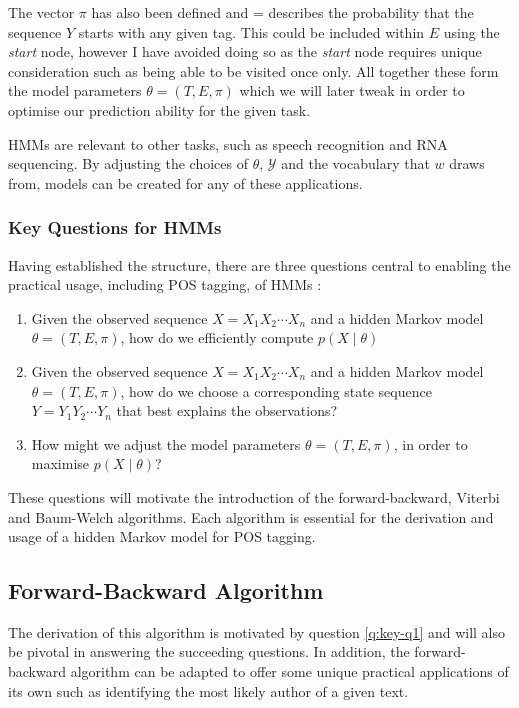 \documentclass[../main.tex]{subfiles}
\begin{document}
The vector $\pi$ has also been defined and = describes the probability that the sequence $Y$ starts with any given tag. This could be included within $E$ using the \textit{start} node, however I have avoided doing so as the \textit{start} node requires unique consideration such as being able to be visited once only.
All together these form the model parameters $\theta = (T,E,\pi)$ which we will later tweak in order to optimise our prediction ability for the given task.

HMMs are relevant to other tasks, such as speech recognition and RNA sequencing. By adjusting the choices of $\theta$, $\mathcal{Y}$ and the vocabulary that $w$ draws from, models can be created for any of these applications.

\subsubsection{Key Questions for HMMs}

Having established the structure, there are three questions central to enabling the practical usage, including POS tagging, of HMMs \autocite{rabiner-1989-tutorial}:
\begin{enumerate}
    \item Given the observed sequence $X = X_1 X_2 \cdots X_n$ and a hidden Markov model $\theta = (T, E, \pi)$, how do we efficiently compute $p(X \mid \theta)$ \label{q:key-q1}
    \item Given the observed sequence $X = X_1 X_2 \cdots X_n$ and a hidden Markov model $\theta = (T, E, \pi)$, how do we choose a corresponding state sequence $Y = Y_1 Y_2 \cdots Y_n$ that best explains the observations? \label{q:key-q2}
    \item How might we adjust the model parameters $\theta = (T, E, \pi)$, in order to maximise $p(X \mid \theta)$? \label{q:key-q3}
\end{enumerate}
These questions will motivate the introduction of the forward-backward, Viterbi and Baum-Welch algorithms. Each algorithm is essential for the derivation and usage of a hidden Markov model for POS tagging.

\subsection{Forward-Backward Algorithm}

The derivation of this algorithm is motivated by question \ref{q:key-q1} and will also be pivotal in answering the succeeding questions.
In addition, the forward-backward algorithm can be adapted to offer some unique practical applications of its own such as identifying the most likely author of a given text.
\end{document}
